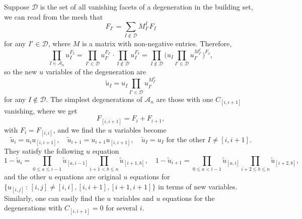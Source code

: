 \documentclass[hidelinks,12pt]{article}
\begin{document}
Suppose $\mathscr D$ is the set of all vanishing facets of a degeneration in the building set, 
we can read from the mesh that
\[
F_{I'}=\sum_{I\not\in \mathscr D}M_{I'}^IF_I
\]
for any $I'\in \mathscr D$, where $M$ is a matrix with non-negative entries. Therefore,
\[
\prod_{I\in \mathscr A_n}u_{I}^{F_{I}}=
\prod_{I'\in \mathscr D}u_{I'}^{F_{I'}}
\cdot
\prod_{I\not\in \mathscr D}u_{I}^{F_{I}}=
\prod_{I\not\in \mathscr D}\biggl(
u_I\prod_{I'\in \mathscr D}u_{I'}^{M_{I'}^I}
\bigg)^{F_I},
\]
so the new $u$ variables of the degeneration are
\begin{equation}
    \tilde u_{I}=u_I\prod_{I'\in \mathscr D}u_{I'}^{M_{I'}^I}
\end{equation}
for any $I\not\in \mathscr D$.  The simplest degenerations of $\mathscr A_n$ are those with one $C_{[i,i+1]}$ vanishing, where we get 
\[
	F_{[i,i+1]}=F_{i}+F_{i+1},
\]
with $F_i=F_{[i,i]}$, and we find the $u$ variables become
\[
	\tilde u_{i}=u_{i} u_{[i,i+1]},\quad 
	\tilde u_{i+1}=u_{i+1} u_{[i,i+1]},\quad 
	\tilde u_I=u_I \text{ for the other $I\neq [i,i+1]$}.
\]
They satisfy the following $u$ equation
\begin{equation}
	1-\tilde u_{i}=\prod_{0\leq a\leq i-1}\tilde u_{[a,i-1]}
	\prod_{i+1< b\leq n} \tilde u_{[i+1,b]},\quad 
	1-\tilde u_{i+1}=\prod_{0\leq a <i-1} \tilde u_{[a,i]}
	\prod_{i+2\leq b\leq n} \tilde u_{[i+2,b]},\quad 
\end{equation}
and the other $u$ equations are original $u$ equations for $\{u_{[i,j]}\,:\, [i,j]\neq [i,i],[i,i+1],[i+1,i+1]\}$ in terms of new variables. Similarly, one can easily find the $u$ variables and $u$ equations for the degenerations with $C_{[i,i+1]}=0$ for several $i$.

\end{document}
